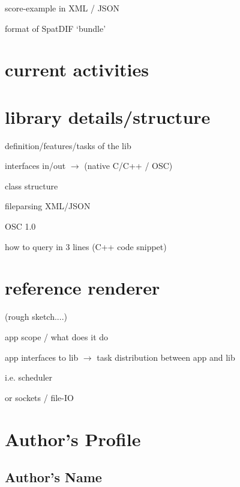 \documentclass{article}
\begin{document}
score-example in XML / JSON

format of SpatDIF `bundle'

\section{current activities} %

\section{library details/structure} %

definition/features/tasks of the lib

interfaces in/out $\rightarrow$ (native C/C++ / OSC)

class structure


fileparsing XML/JSON

OSC 1.0

how to query in 3 lines (C++ code snippet)

\section{reference renderer }%

(rough sketch....)

app scope / what does it do

app interfaces to lib $\rightarrow$ task distribution between app and lib

i.e. scheduler

or sockets / file-IO




\printbibliography

% 

\section{Author's Profile}


\subsection*{Author's Name}
\end{document}

